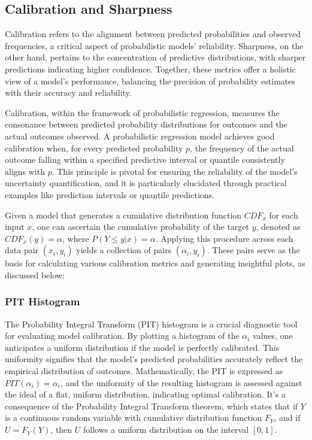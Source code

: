 \documentclass{article}
\begin{document}
\subsection{Calibration and Sharpness}
Calibration refers to the alignment between predicted probabilities and observed frequencies, a critical aspect of probabilistic models' reliability. Sharpness, on the other hand, pertains to the concentration of predictive distributions, with sharper predictions indicating higher confidence. Together, these metrics offer a holistic view of a model's performance, balancing the precision of probability estimates with their accuracy and reliability.

Calibration, within the framework of probabilistic regression, measures the consonance between predicted probability distributions for outcomes and the actual outcomes observed. A probabilistic regression model achieves good calibration when, for every predicted probability $p$, the frequency of the actual outcome falling within a specified predictive interval or quantile consistently aligns with $p$. This principle is pivotal for ensuring the reliability of the model's uncertainty quantification, and it is particularly elucidated through practical examples like prediction intervals or quantile predictions.

Given a model that generates a cumulative distribution function $CDF_x$ for each input $x$, one can ascertain the cumulative probability of the target $y$, denoted as $CDF_x(y) = \alpha$, where $P(Y \leq y|x) = \alpha$. Applying this procedure across each data pair $(x_i, y_i)$ yields a collection of pairs $(\alpha_i, y_i)$. These pairs serve as the basis for calculating various calibration metrics and generating insightful plots, as discussed below:

\subsubsection{PIT Histogram}
The Probability Integral Transform (PIT) histogram is a crucial diagnostic tool for evaluating model calibration. By plotting a histogram of the $\alpha_i$ values, one anticipates a uniform distribution if the model is perfectly calibrated. This uniformity signifies that the model's predicted probabilities accurately reflect the empirical distribution of outcomes. Mathematically, the PIT is expressed as $PIT(\alpha_i) = \alpha_i$, and the uniformity of the resulting histogram is assessed against the ideal of a flat, uniform distribution, indicating optimal calibration. It's a consequence of the Probability Integral Transform theorem, which states that if $Y$ is a continuous random variable with cumulative distribution function $F_Y$, and if $U= F_Y(Y)$, then $U$ follows a uniform distribution on the interval $[0,1]$. 
\end{document}
